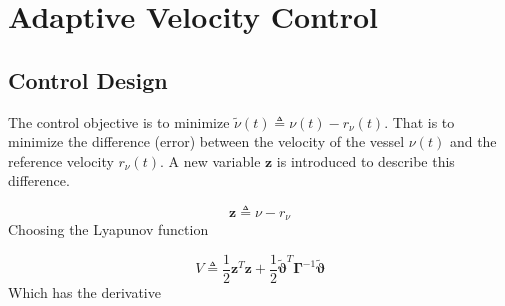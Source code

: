\documentclass[12pt,a4]{article}
\begin{document}
\section{Adaptive Velocity Control}
\subsection{Control Design}
The control objective is to minimize $\tilde{\nu}(t) \triangleq \nu(t) - r_{\nu}(t)$.
That is to minimize the difference (error) between the velocity of the vessel $\nu(t)$ and the reference velocity $r_{\nu}(t)$.
A new variable $\bm{z}$ is introduced to describe this difference.

\begin{equation}
	\bm{z} \triangleq \nu - r_{\nu}
\end{equation}
Choosing the Lyapunov function

\begin{equation}
	V \triangleq \frac{1}{2}\bm{z}^T\bm{z} + \frac{1}{2}\bm{\tilde{\vartheta}}^T\bm{\Gamma}^{-1}\bm{\tilde{\vartheta}}
\end{equation}
Which has the derivative
\end{document}
